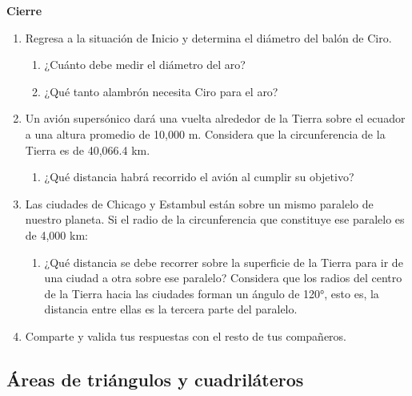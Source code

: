 \documentclass[11pt]{book}
\begin{document}
\begin{boxK}
  \begin{center}\textbf{Cierre}\end{center}
  \begin{enumerate}
    \item Regresa a la situación de Inicio y determina el diámetro del balón de Ciro.
          \begin{enumerate}
            \item ¿Cuánto debe medir el diámetro del aro?
            \item ¿Qué tanto alambrón necesita Ciro para el aro?
          \end{enumerate}
    \item Un avión supersónico dará una vuelta alrededor de la Tierra sobre el
          ecuador a una altura promedio de 10,000 m. Considera que la circunferencia de la Tierra es de 40,066.4 km.
          \begin{enumerate}
            \item ¿Qué distancia habrá recorrido el avión al cumplir su objetivo?
          \end{enumerate}
    \item Las ciudades de Chicago y Estambul están sobre un mismo paralelo de
          nuestro planeta. Si el radio de la circunferencia que constituye ese
          paralelo es de 4,000 km:
          \begin{enumerate}
            \item ¿Qué distancia se debe recorrer sobre la superficie de la Tierra para
                  ir de una ciudad a otra sobre ese paralelo? Considera que los radios
                  del centro de la Tierra hacia las ciudades forman un ángulo de 120°,
                  esto es, la distancia entre ellas es la tercera parte del paralelo.
          \end{enumerate}
    \item Comparte y valida tus respuestas con el resto de tus compañeros.
  \end{enumerate}
\end{boxK}

\newpage
\subsection{Áreas de triángulos y cuadriláteros}
\end{document}
